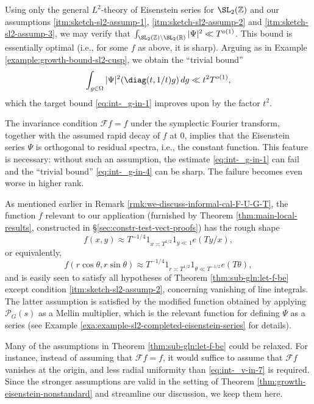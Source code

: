 \begin{remark}
  Using only the general $L^2$-theory of Eisenstein series for $\SL_2(\mathbb{Z})$ and our assumptions \eqref{itm:sketch-sl2-assump-1}, \eqref{itm:sketch-sl2-assump-2} and \eqref{itm:sketch-sl2-assump-3}, we may verify that $\int_{\SL_2(\mathbb{Z}) \backslash \SL_2(\mathbb{R}) } |\Psi|^2 \ll T^{o(1)}$.  This bound is essentially optimal (i.e., for some $f$ as above, it is sharp).  Arguing as in Example \ref{example:growth-bound-sl2-cusp}, we obtain the ``trivial bound''
  \begin{equation}\label{eq:int-_g-in-4}
    \int_{g \in \Omega } |\Psi|^2 (\diag(t, 1/t) g) \, d g
    \ll
    t^2 T^{o(1)},
  \end{equation}
  which the target bound \eqref{eq:int-_g-in-1} improves upon by the factor $t^2$.
\end{remark}
\begin{remark}
  The invariance condition $\mathcal{F} f = f$ under the symplectic Fourier transform, together with the assumed rapid decay of $f$ at $0$, implies that the Eisenstein series $\Psi$ is orthogonal to residual spectra, i.e., the constant function.  This feature is necessary: without such an assumption, the estimate \eqref{eq:int-_g-in-1} can fail and the ``trivial bound'' \eqref{eq:int-_g-in-4} can be sharp.  The failure becomes even worse in higher rank.
\end{remark}
\begin{remark}
  As mentioned earlier in Remark \ref{rmk:we-discuss-informal-cal-F-U-G-T}, the function $f$ relevant to our application (furnished by Theorem \ref{thm:main-local-results}, constructed in \S\ref{sec:constr-test-vect-proofs}) has the rough shape
  \begin{equation*}
    f(x,y) \approx T^{-1/4} 1_{x \asymp T^{1/2}} 1_{y \ll 1} e(T y / x),
  \end{equation*}
  or equivalently,
  \begin{equation*}
    f(r \cos \theta, r \sin \theta) \approx
    T^{-1/4} 1_{r \asymp T^{1/2}}
    1 _{\theta \ll T^{-1/2}} e(T \theta),
  \end{equation*}
  and is easily seen to satisfy all hypotheses of Theorem \ref{thm:sub-gln:let-f-be} except condition \eqref{itm:sketch-sl2-assump-2}, concerning vanishing of line integrals.  The latter assumption is satisfied by the modified function obtained by applying $\mathcal{P}_G(s)$ as a Mellin multiplier, which is the relevant function for defining $\Psi$ as a series (see Example \ref{exa:example-sl2-completed-eisenstein-series} for details).
\end{remark}
\begin{remark}
  Many of the assumptions in Theorem \ref{thm:sub-gln:let-f-be} could be relaxed.  For instance, instead of assuming that $\mathcal{F} f = f$, it would suffice to assume that $\mathcal{F} f$ vanishes at the origin, and less radial uniformity than \eqref{eq:int-_v-in-7} is required.  Since the stronger assumptions are valid in the setting of Theorem \ref{thm:growth-eisenstein-nonstandard} and streamline our discussion, we keep them here.
\end{remark}

